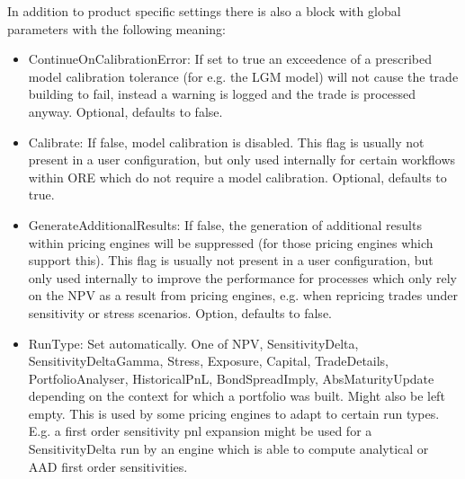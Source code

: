 \medskip
In addition to product specific settings there is also a block with global parameters with the following meaning:
\begin{itemize}
\item ContinueOnCalibrationError: If set to true an exceedence of a prescribed model calibration tolerance (for e.g. the
  LGM model) will not cause the trade building to fail, instead a warning is logged and the trade is processed
  anyway. Optional, defaults to false.
\item Calibrate: If false, model calibration is disabled. This flag is usually not present in a user configuration, but
  only used internally for certain workflows within ORE which do not require a model calibration. Optional, defaults to
  true.
\item GenerateAdditionalResults: If false, the generation of additional results within pricing engines will be
  suppressed (for those pricing engines which support this). This flag is usually not present in a user configuration,
  but only used internally to improve the performance for processes which only rely on the NPV as a result from pricing
  engines, e.g. when repricing trades under sensitivity or stress scenarios. Option, defaults to false.
\item RunType: Set automatically. One of NPV, SensitivityDelta, SensitivityDeltaGamma, Stress, Exposure, Capital,
  TradeDetails, PortfolioAnalyser, HistoricalPnL, BondSpreadImply, AbsMaturityUpdate depending on the context for which
  a portfolio was built. Might also be left empty. This is used by some pricing engines to adapt to certain run
  types. E.g. a first order sensitivity pnl expansion might be used for a SensitivityDelta run by an engine which is
  able to compute analytical or AAD first order sensitivities.
\end{itemize}

